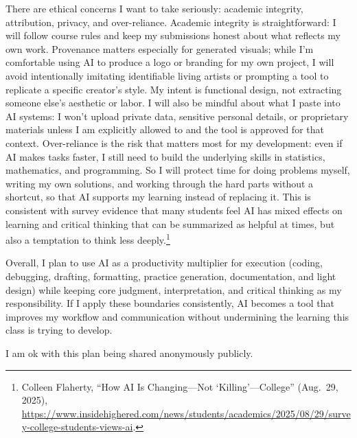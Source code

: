 \documentclass[10pt]{extarticle}
\begin{document}
There are ethical concerns I want to take seriously: academic integrity, attribution, privacy, and over-reliance. Academic integrity is straightforward: I will follow course rules and keep my submissions honest about what reflects my own work. Provenance matters especially for generated visuals; while I’m comfortable using AI to produce a logo or branding for my own project, I will avoid intentionally imitating identifiable living artists or prompting a tool to replicate a specific creator’s style. My intent is functional design, not extracting someone else’s aesthetic or labor. I will also be mindful about what I paste into AI systems: I won’t upload private data, sensitive personal details, or proprietary materials unless I am explicitly allowed to and the tool is approved for that context. Over-reliance is the risk that matters most for my development: even if AI makes tasks faster, I still need to build the underlying skills in statistics, mathematics, and programming. So I will protect time for doing problems myself, writing my own solutions, and working through the hard parts without a shortcut, so that AI supports my learning instead of replacing it. This is consistent with survey evidence that many students feel AI has mixed effects on learning and critical thinking that can be summarized as helpful at times, but also a temptation to think less deeply.\footnote{Colleen Flaherty, ``How AI Is Changing---Not `Killing'---College'' (Aug.\ 29, 2025), \url{https://www.insidehighered.com/news/students/academics/2025/08/29/survey-college-students-views-ai}.}

\medskip

Overall, I plan to use AI as a productivity multiplier for execution (coding, debugging, drafting, formatting, practice generation, documentation, and light design) while keeping core judgment, interpretation, and critical thinking as my responsibility. If I apply these boundaries consistently, AI becomes a tool that improves my workflow and communication without undermining the learning this class is trying to develop.

\medskip

\noindent *I am ok with this plan being shared anonymously publicly.
\end{document}
